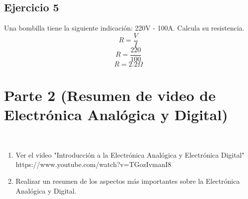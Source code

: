 \documentclass[stu, 12pt, letterpaper, donotrepeattitle, floatsintext, natbib, helv]{apa7}
\begin{document}
\subsection{Ejercicio 5}
Una bombilla tiene la siguiente indicación: 220V - 100A. Calcula su resistencia.
\[R = \frac{V}{I}\]
\[R = \frac{220}{100}\]
\[R = 2.2\Omega\]

\section{Parte 2 (Resumen de video de Electrónica Analógica y Digital)}
\noindent \cite{video}\\
\begin{enumerate}
    \item Ver el video "Introducción a la Electrónica Analógica y Electrónica Digital" https://www.youtube.com/watch?v=TGozIvmanI8
    \item Realizar un resumen de los aspectos más importantes sobre la Electrónica Analógica y Digital.
\end{enumerate}
\end{document}
